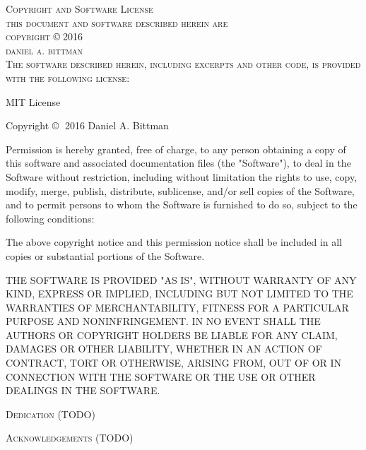 \documentclass[12pt]{article}
\begin{document}
\begin{center}
	\textsc{{\Large Copyright and Software License}}\\
	\vspace{1in}
	\textsc{this document and software described herein are\\\vspace{5mm}copyright} \copyright $\;$\textsc{2016\\daniel a. bittman}\\
	\vspace{1in}
	\textsc{The software described herein, including excerpts and other code, is provided with the following license:}

	MIT License

Copyright \copyright $\;$ 2016 Daniel A. Bittman

Permission is hereby granted, free of charge, to any person obtaining a copy
of this software and associated documentation files (the "Software"), to deal
in the Software without restriction, including without limitation the rights
to use, copy, modify, merge, publish, distribute, sublicense, and/or sell
copies of the Software, and to permit persons to whom the Software is
furnished to do so, subject to the following conditions:

The above copyright notice and this permission notice shall be included in all
copies or substantial portions of the Software.

THE SOFTWARE IS PROVIDED "AS IS", WITHOUT WARRANTY OF ANY KIND, EXPRESS OR
IMPLIED, INCLUDING BUT NOT LIMITED TO THE WARRANTIES OF MERCHANTABILITY,
FITNESS FOR A PARTICULAR PURPOSE AND NONINFRINGEMENT. IN NO EVENT SHALL THE
AUTHORS OR COPYRIGHT HOLDERS BE LIABLE FOR ANY CLAIM, DAMAGES OR OTHER
LIABILITY, WHETHER IN AN ACTION OF CONTRACT, TORT OR OTHERWISE, ARISING FROM,
OUT OF OR IN CONNECTION WITH THE SOFTWARE OR THE USE OR OTHER DEALINGS IN THE
SOFTWARE.

\end{center}
\clearpage

\begin{center}
	{\Large\textsc{Dedication (TODO)}}\\
\end{center}
\begin{center}
	{\Large\textsc{Acknowledgements (TODO)}}\\
\end{center}
\clearpage
\tableofcontents
\clearpage
\listoffigures
\listoftables
\clearpage

\renewcommand{\thepage}{\arabic{page}}
\setcounter{page}{1}
\end{document}
